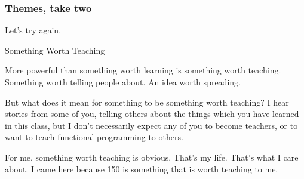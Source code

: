\documentclass[aspectratio=169, handout]{beamer}
\begin{document}

\begin{frame}[fragile]
  \frametitle{Themes, take two}

  Let's try again.

  \pause
  \vspace{\fill}

  \begin{center}
    \large Something Worth Teaching
  \end{center}



  \pause
  \vspace{\fill}

  More powerful than something worth learning is something worth teaching.
  Something worth telling people about. An idea worth spreading.

  \pause
  \vspace{\fill}

  But what does it mean for something to be something worth teaching? I hear
  stories from some of you, telling others about the things which you have
  learned in this class, but I don't necessarily expect any of you to become
  teachers, or to want to teach functional programming to others.

  \pause
  \vspace{\fill}

  For me, something worth teaching is obvious. That's my life. That's what I
  care about. I came here because 150 is something that is worth teaching to me.
\end{frame}
\end{document}
